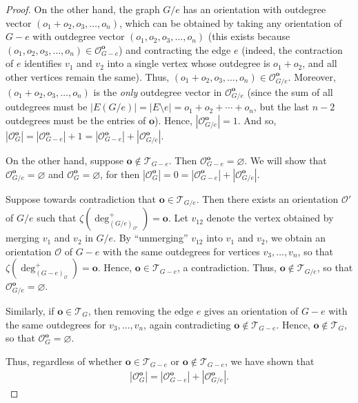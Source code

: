 \documentclass[12pt]{article}
\renewcommand{\emptyset}{\varnothing} %
\theoremstyle{definition}
\theoremstyle{remark}
\newcommand{\oo}{\mathbf{o}}
\newcommand{\abs}[1]{\left| #1 \right|}
\newcommand{\out}{\mathscr{O}}
\begin{document}
\begin{proof}
	On the other hand, the graph $G/e$ has an orientation with outdegree vector $(o_1+o_2,o_3,\ldots,o_n)$, which can be obtained by taking any orientation of $G-e$ with outdegree vector $(o_1,o_2,o_3,\ldots,o_n)$ (this exists because $(o_1,o_2,o_3,\ldots,o_n) \in \out_{G-e}^\textbf{o}$) and contracting the edge $e$ (indeed, the contraction of $e$ identifies $v_1$ and $v_2$ into a single vertex whose outdegree is $o_1+o_2$, and all other vertices remain the same).
	Thus, $(o_1+o_2,o_3,\ldots,o_n) \in \out_{G/e}^\textbf{o}$.
	Moreover, $(o_1+o_2,o_3,\ldots,o_n)$ is the \textit{only} outdegree vector in $\out_{G/e}^\textbf{o}$ (since the sum of all outdegrees must be $\abs{E(G/e)} = \abs{E\setminus e} = o_1+o_2+\cdots+o_n$, but the last $n-2$ outdegrees must be the entries of $\mathbf{o}$).
	Hence, $|\out_{G/e}^\textbf{o}| = 1$.
	And so, $\abs{\out_G^\textbf{o}} = \abs{\out_{G-e}^\textbf{o}}+1 =|\out_{G-e}^\textbf{o}|+|\out_{G/e}^\textbf{o}|$.

    \bigskip
    On the other hand, suppose $\oo \notin \mathscr{T}_{G-e}$. Then $\out_{G-e}^\oo = \emptyset$. We will show that $\out_{G/e}^\oo = \emptyset$ and $\out_{G}^\oo = \emptyset$, for then $|\out_{G}^\textbf{o}| = 0 = |\out_{G-e}^\textbf{o}|+|\out_{G/e}^\textbf{o}|$.

    Suppose towards contradiction that $\textbf{o} \in \mathscr{T}_{G/e}$. Then there exists an orientation $\mathcal{O}'$ of $G/e$ such that $\zeta(\deg_{(G/e)_{\mathcal{O}'}}^+) = \oo$. Let $v_{12}$ denote the vertex obtained by merging $v_1$ and $v_2$ in $G/e$. By ``unmerging'' $v_{12}$ into $v_1$ and $v_2$, we obtain an orientation $\mathcal{O}$ of $G-e$ with the same outdegrees for vertices $v_3,\ldots,v_n$, so that $\zeta(\deg_{(G-e)_{\mathcal{O}}}^{+}) = \oo$. Hence, $\oo \in \mathscr{T}_{G-e}$, a contradiction. Thus, $\textbf{o} \notin \mathscr{T}_{G/e}$, so that $\mathscr{O}_{G/e}^\textbf{o} = \emptyset$.

    Similarly, if $\textbf{o} \in \mathscr{T}_G$, then removing the edge $e$ gives an orientation of $G-e$ with the same outdegrees for $v_3,\ldots,v_n$, again contradicting $\textbf{o} \notin \mathscr{T}_{G-e}$. Hence, $\textbf{o} \notin \mathscr{T}_{G}$, so that $\mathscr{O}_{G}^\textbf{o} = \emptyset$.
	
	\bigskip
	
	Thus, regardless of whether $\oo \in \mathscr{T}_{G-e}$ or $\oo \notin \mathscr{T}_{G-e}$, we have shown that
	\begin{align}
	|\out_{G}^\oo| = |\out_{G-e}^\oo|+|\out_{G/e}^\oo|.
	\label{eq.outoo}
	\end{align}
    

\end{proof}
\end{document}

